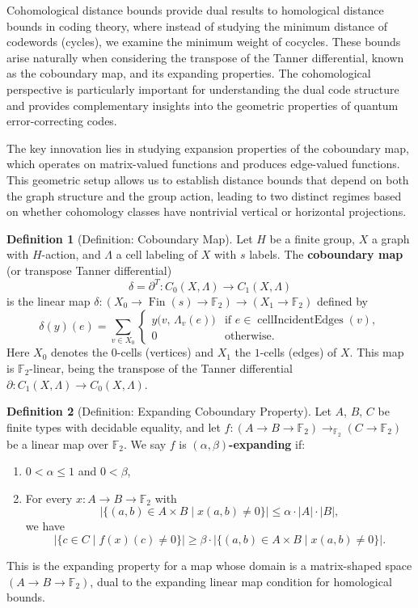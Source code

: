 \documentclass[11pt]{article}
\theoremstyle{plain}
\theoremstyle{definition}
\newtheorem*{definition}{Definition}
\theoremstyle{remark}
\begin{document}
Cohomological distance bounds provide dual results to homological distance bounds in coding theory, where instead of studying the minimum distance of codewords (cycles), we examine the minimum weight of cocycles. These bounds arise naturally when considering the transpose of the Tanner differential, known as the coboundary map, and its expanding properties. The cohomological perspective is particularly important for understanding the dual code structure and provides complementary insights into the geometric properties of quantum error-correcting codes.

The key innovation lies in studying expansion properties of the coboundary map, which operates on matrix-valued functions and produces edge-valued functions. This geometric setup allows us to establish distance bounds that depend on both the graph structure and the group action, leading to two distinct regimes based on whether cohomology classes have nontrivial vertical or horizontal projections.

\begin{definition}[Definition: Coboundary Map]
Let $H$ be a finite group, $X$ a graph with $H$-action, and $\Lambda$ a cell labeling of $X$ with $s$ labels. The \textbf{coboundary map} (or transpose Tanner differential)
\[
\delta = \partial^T : C_0(X, \Lambda) \longrightarrow C_1(X, \Lambda)
\]
is the linear map $\delta : (X_0 \to \operatorname{Fin}(s) \to \mathbb{F}_2) \to (X_1 \to \mathbb{F}_2)$ defined by
\[
\delta(y)(e) = \sum_{v \in X_0} \begin{cases} y\bigl(v,\, \Lambda_v(e)\bigr) & \text{if } e \in \operatorname{cellIncidentEdges}(v), \\ 0 & \text{otherwise.} \end{cases}
\]
Here $X_0$ denotes the $0$-cells (vertices) and $X_1$ the $1$-cells (edges) of $X$. This map is $\mathbb{F}_2$-linear, being the transpose of the Tanner differential $\partial : C_1(X,\Lambda) \to C_0(X,\Lambda)$.
\end{definition}

\begin{definition}[Definition: Expanding Coboundary Property]
Let $A$, $B$, $C$ be finite types with decidable equality, and let $f : (A \to B \to \mathbb{F}_2) \to_{\mathbb{F}_2} (C \to \mathbb{F}_2)$ be a linear map over $\mathbb{F}_2$. We say $f$ is \textbf{$(\alpha, \beta)$-expanding} if:
\begin{enumerate}
  \item $0 < \alpha \leq 1$ and $0 < \beta$,
  \item For every $x : A \to B \to \mathbb{F}_2$ with
    \[
    \bigl|\{(a,b) \in A \times B \mid x(a,b) \neq 0\}\bigr| \leq \alpha \cdot |A| \cdot |B|,
    \]
    we have
    \[
    \bigl|\{c \in C \mid f(x)(c) \neq 0\}\bigr| \geq \beta \cdot \bigl|\{(a,b) \in A \times B \mid x(a,b) \neq 0\}\bigr|.
    \]
\end{enumerate}
This is the expanding property for a map whose domain is a matrix-shaped space $(A \to B \to \mathbb{F}_2)$, dual to the expanding linear map condition for homological bounds.
\end{definition}
\end{document}
